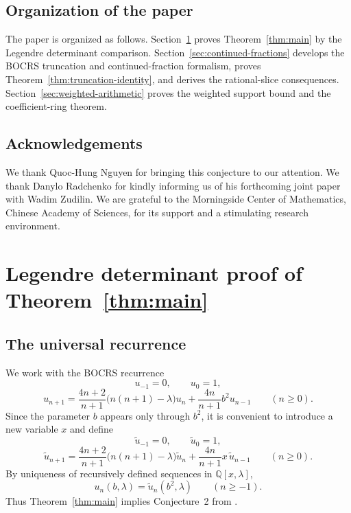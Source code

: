 \documentclass[11pt,letterpaper]{amsart}
\numberwithin{equation}{section}
\theoremstyle{plain}
\theoremstyle{remark}
\newcommand{\Q}{\mathbb{Q}}
\begin{document}
\subsection*{Organization of the paper}

The paper is organized as follows. Section~\ref{sec:main-proof} proves
Theorem~\ref{thm:main} by the Legendre determinant comparison.
Section~\ref{sec:continued-fractions} develops the BOCRS truncation and continued-fraction
formalism, proves Theorem~\ref{thm:truncation-identity}, and derives the rational-slice
consequences. Section~\ref{sec:weighted-arithmetic} proves the weighted support bound and the
coefficient-ring theorem.

\subsection*{Acknowledgements}

We thank Quoc-Hung Nguyen for bringing this conjecture to our attention. We thank Danylo Radchenko for kindly informing us of his forthcoming joint paper with Wadim Zudilin. We are grateful to the Morningside Center of Mathematics, Chinese Academy of Sciences, for its support and a stimulating research environment.

\section{Legendre determinant proof of Theorem~\ref{thm:main}}
\label{sec:main-proof}

\subsection{The universal recurrence}

We work with the BOCRS recurrence
\begin{equation}\label{eq:original-recurrence}
 u_{-1}=0,\qquad u_0=1,
\end{equation}
\begin{equation}\label{eq:u-recurrence}
 u_{n+1}=\frac{4n+2}{n+1}\bigl(n(n+1)-\lambda\bigr)u_n
 +\frac{4n}{n+1}b^2u_{n-1}
 \qquad(n\ge 0).
\end{equation}
Since the parameter \(b\) appears only through \(b^2\), it is convenient to introduce a new
variable \(x\) and define
\begin{equation}\label{eq:utilde-recurrence-init}
 \widetilde u_{-1}=0,\qquad \widetilde u_0=1,
\end{equation}
\begin{equation}\label{eq:utilde-recurrence}
 \widetilde u_{n+1}=\frac{4n+2}{n+1}\bigl(n(n+1)-\lambda\bigr)\widetilde u_n
 +\frac{4n}{n+1}x\,\widetilde u_{n-1}
 \qquad(n\ge 0).
\end{equation}
By uniqueness of recursively defined sequences in \(\Q[x,\lambda]\),
\[
u_n(b,\lambda)=\widetilde u_n(b^2,\lambda)\qquad(n\ge -1).
\]
Thus Theorem~\ref{thm:main} implies Conjecture~2 from \cite[\S10.3]{BOCRS}.
\end{document}
